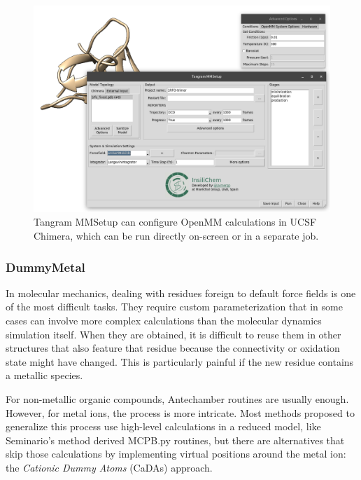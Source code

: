 \begin{figure}
	\begin{Center}
		\includegraphics[width=\textwidth]{./figures/05/tangram_mm.png}
	\end{Center}
	\caption[Tangram MMSetup]{Tangram MMSetup can configure OpenMM calculations in UCSF Chimera, which can be run directly on-screen or in a separate job.}
	\label{fig:tangram-mmsetup}
\end{figure}


\subsubsection{DummyMetal}
In molecular mechanics, dealing with residues foreign to default force fields is one of the most difficult tasks. They require custom parameterization that in some cases can involve more complex calculations than the molecular dynamics simulation itself. When they are obtained, it is difficult to reuse them in other structures that also feature that residue because the connectivity or oxidation state might have changed. This is particularly painful if the new residue contains a metallic species.

For non-metallic organic compounds, Antechamber\cite{wang2001antechamber} routines are usually enough. However, for metal ions, the process is more intricate. Most methods proposed to generalize this process use high-level calculations in a reduced model, like Seminario's method derived MCPB.py routines,\cite{mcpbpy} but there are alternatives that skip those calculations by implementing virtual positions around the metal ion: the \textit{Cationic Dummy Atoms} (CaDAs) approach.\cite{duarte2014}

